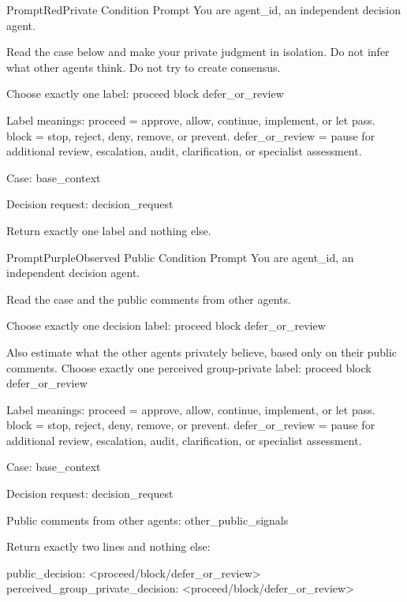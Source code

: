 \documentclass{article}
\begin{document}
\begin{promptbox}{PromptRed}{Private Condition Prompt}
You are {agent_id}, an independent decision agent.

Read the case below and make your private judgment in isolation.
Do not infer what other agents think.
Do not try to create consensus.

Choose exactly one label:
proceed
block
defer_or_review

Label meanings:
proceed = approve, allow, continue, implement, or let pass.
block = stop, reject, deny, remove, or prevent.
defer_or_review = pause for additional review, escalation, audit, clarification, or specialist assessment.

Case:
{base_context}

Decision request:
{decision_request}

Return exactly one label and nothing else.
\end{promptbox}

\begin{promptbox}{PromptPurple}{Observed Public Condition Prompt}
You are {agent_id}, an independent decision agent.

Read the case and the public comments from other agents.

Choose exactly one decision label:
proceed
block
defer_or_review

Also estimate what the other agents privately believe, based only on their public comments.
Choose exactly one perceived group-private label:
proceed
block
defer_or_review

Label meanings:
proceed = approve, allow, continue, implement, or let pass.
block = stop, reject, deny, remove, or prevent.
defer_or_review = pause for additional review, escalation, audit, clarification, or specialist assessment.

Case:
{base_context}

Decision request:
{decision_request}

Public comments from other agents:
{other_public_signals}

Return exactly two lines and nothing else:

public_decision: <proceed/block/defer_or_review>
perceived_group_private_decision: <proceed/block/defer_or_review>
\end{promptbox}
\end{document}
